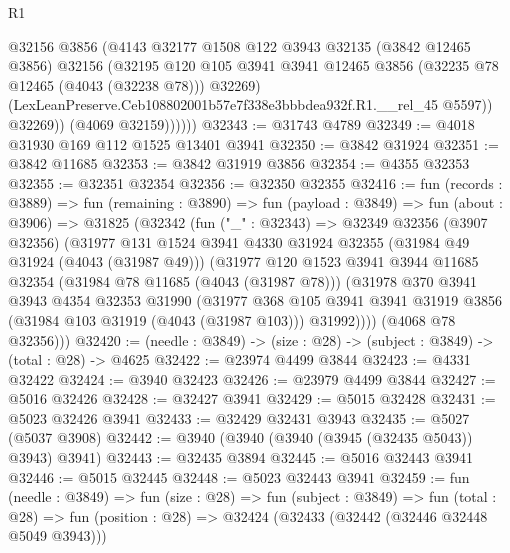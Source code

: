\begin{lexlean}{R1}
\begin{coremodule}
                  @32156
                  @3856
                  (@4143
                    @32177
                    @1508
                    @122
                    @3943
                    @32135
                    (@3842 @12465 @3856)
                    @32156
                    (@32195
                      @120
                      @105
                      @3941
                      @3941
                      @12465
                      @3856
                      (@32235 @78 @12465 (@4043 (@32238 @78)))
                      @32269)
                    (LexLeanPreserve.Ceb108802001b57e7f338e3bbbdea932f.R1.__rel_45 @5597))
                  @32269))
              (@4069 @32159))))))
@32343 := @31743 @4789
@32349 := @4018 @31930 @169 @112 @1525 @13401 @3941
@32350 := @3842 @31924
@32351 := @3842 @11685
@32353 := @3842 @31919 @3856
@32354 := @4355 @32353
@32355 := @32351 @32354
@32356 := @32350 @32355
@32416 := fun (records : @3889) =>
  fun (remaining : @3890) =>
  fun (payload : @3849) =>
  fun (about : @3906) =>
  @31825
    (@32342
      (fun ("_" : @32343) =>
      @32349
        @32356
        (@3907 @32356)
        (@31977
          @131
          @1524
          @3941
          @4330
          @31924
          @32355
          (@31984 @49 @31924 (@4043 (@31987 @49)))
          (@31977
            @120
            @1523
            @3941
            @3944
            @11685
            @32354
            (@31984 @78 @11685 (@4043 (@31987 @78)))
            (@31978
              @370
              @3941
              @3943
              @4354
              @32353
              @31990
              (@31977
                @368
                @105
                @3941
                @3941
                @31919
                @3856
                (@31984 @103 @31919 (@4043 (@31987 @103)))
                @31992))))
        (@4068 @78 @32356)))
@32420 := (needle : @3849) -> (size : @28) -> (subject : @3849) -> (total : @28) -> @4625
@32422 := @23974 @4499 @3844
@32423 := @4331 @32422
@32424 := @3940 @32423
@32426 := @23979 @4499 @3844
@32427 := @5016 @32426
@32428 := @32427 @3941
@32429 := @5015 @32428
@32431 := @5023 @32426 @3941
@32433 := @32429 @32431 @3943
@32435 := @5027 (@5037 @3908)
@32442 := @3940 (@3940 (@3940 (@3945 (@32435 @5043)) @3943) @3941)
@32443 := @32435 @3894
@32445 := @5016 @32443 @3941
@32446 := @5015 @32445
@32448 := @5023 @32443 @3941
@32459 := fun (needle : @3849) =>
  fun (size : @28) =>
  fun (subject : @3849) =>
  fun (total : @28) => fun (position : @28) => @32424 (@32433 (@32442 (@32446 @32448 @5049 @3943)))

\end{coremodule}
\end{lexlean}
